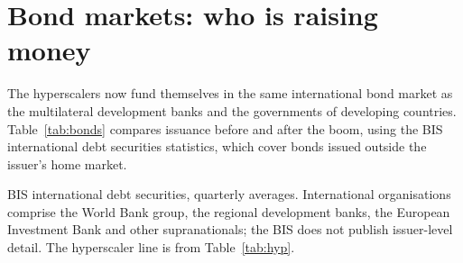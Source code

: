 \documentclass[AER]{AEA}
\begin{document}
\section{Bond markets: who is raising money}\label{sec:bonds}

The hyperscalers now fund themselves in the same international bond market as the multilateral development banks and the governments of developing countries. Table~\ref{tab:bonds} compares issuance before and after the boom, using the BIS international debt securities statistics, which cover bonds issued outside the issuer's home market.

\begin{table}
\caption{International bond issuance before and after the AI boom, USD billion per quarter}\label{tab:bonds}
\begin{tablenotes}
BIS international debt securities, quarterly averages. International organisations comprise the World Bank group, the regional development banks, the European Investment Bank and other supranationals; the BIS does not publish issuer-level detail. The hyperscaler line is from Table~\ref{tab:hyp}.
\end{tablenotes}
\end{table}
\end{document}
